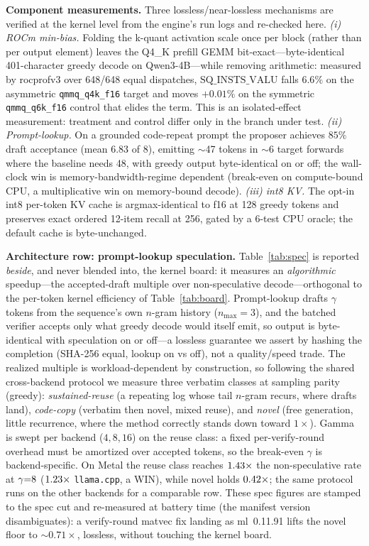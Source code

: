 \documentclass[11pt]{article}
\begin{document}
\textbf{Component measurements.} Three lossless/near-lossless mechanisms are verified at the
kernel level from the engine's run logs and re-checked here.
\emph{(i) ROCm min-bias.} Folding the k-quant activation scale once per block (rather than per
output element) leaves the Q4\_K prefill GEMM bit-exact---byte-identical 401-character greedy
decode on Qwen3-4B---while removing arithmetic: measured by rocprofv3 over 648/648 equal
dispatches, $\text{SQ\_INSTS\_VALU}$ falls $6.6\%$ on the asymmetric \texttt{qmmq\_q4k\_f16}
target and moves $+0.01\%$ on the symmetric \texttt{qmmq\_q6k\_f16} control that elides the
term. This is an isolated-effect measurement: treatment and control differ only in the branch
under test. \emph{(ii) Prompt-lookup.} On a grounded code-repeat prompt the proposer achieves
$85\%$ draft acceptance (mean $6.83$ of $8$), emitting $\sim$47 tokens in $\sim$6 target
forwards where the baseline needs 48, with greedy output byte-identical on or off; the
wall-clock win is memory-bandwidth-regime dependent (break-even on compute-bound CPU, a
multiplicative win on memory-bound decode). \emph{(iii) int8 KV.} The opt-in int8 per-token KV
cache is argmax-identical to f16 at 128 greedy tokens and preserves exact ordered 12-item
recall at 256, gated by a 6-test CPU oracle; the default cache is byte-unchanged.

\textbf{Architecture row: prompt-lookup speculation.} Table~\ref{tab:spec} is reported
\emph{beside}, and never blended into, the kernel board: it measures an \emph{algorithmic}
speedup---the accepted-draft multiple over non-speculative decode---orthogonal to the
per-token kernel efficiency of Table~\ref{tab:board}. Prompt-lookup drafts $\gamma$ tokens from
the sequence's own $n$-gram history ($n_{\max}{=}3$), and the batched verifier accepts only
what greedy decode would itself emit, so output is byte-identical with speculation on or off---a
lossless guarantee we assert by hashing the completion (SHA-256 equal, lookup on vs off), not a
quality/speed trade. The realized multiple is workload-dependent by construction, so following
the shared cross-backend protocol we measure three verbatim classes at sampling parity (greedy):
\emph{sustained-reuse} (a repeating log whose tail $n$-gram recurs, where drafts land),
\emph{code-copy} (verbatim then novel, mixed reuse), and \emph{novel} (free generation, little
recurrence, where the method correctly stands down toward $1\times$). Gamma is swept per backend
($4,8,16$) on the reuse class: a fixed per-verify-round overhead must be amortized over accepted
tokens, so the break-even $\gamma$ is backend-specific. On Metal the reuse class reaches
$1.43\times$ the non-speculative rate at $\gamma{=}8$
($1.23\times$ \texttt{llama.cpp}, a WIN), while novel holds
$0.42\times$; the same protocol runs on the other backends for a comparable row.
These spec figures are stamped to the spec cut and re-measured at battery time (the manifest
version disambiguates): a verify-round matvec fix landing as ml~0.11.91 lifts the novel floor
to $\sim\!0.71\times$, lossless, without touching the kernel board.
\end{document}
